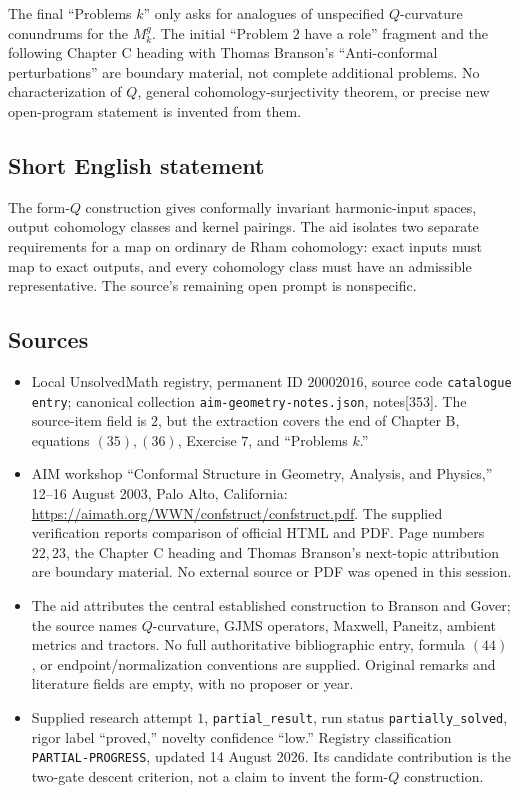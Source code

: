 \documentclass[11pt]{article}
\begin{document}
The final ``Problems \(k\)'' only asks for analogues of unspecified \(Q\)-curvature conundrums for the \(M_k^g\). The initial ``Problem \(2\) have a role'' fragment and the following Chapter C heading with Thomas Branson's ``Anti-conformal perturbations'' are boundary material, not complete additional problems. No characterization of \(Q\), general cohomology-surjectivity theorem, or precise new open-program statement is invented from them.
\subsection{Short English statement}
The form-\(Q\) construction gives conformally invariant harmonic-input spaces, output cohomology classes and kernel pairings. The aid isolates two separate requirements for a map on ordinary de Rham cohomology: exact inputs must map to exact outputs, and every cohomology class must have an admissible representative. The source's remaining open prompt is nonspecific.
\subsection{Sources}
\begin{itemize}
\item Local UnsolvedMath registry, permanent ID \(20002016\), source code \texttt{catalogue entry}; canonical collection \texttt{aim-geometry-notes.json}, notes[353]. The source-item field is \(2\), but the extraction covers the end of Chapter B, equations \((35),(36)\), Exercise \(7\), and ``Problems \(k\).''
\item AIM workshop ``Conformal Structure in Geometry, Analysis, and Physics,'' 12--16 August 2003, Palo Alto, California: \url{https://aimath.org/WWN/confstruct/confstruct.pdf}. The supplied verification reports comparison of official HTML and PDF. Page numbers \(22,23\), the Chapter C heading and Thomas Branson's next-topic attribution are boundary material. No external source or PDF was opened in this session.
\item The aid attributes the central established construction to Branson and Gover; the source names \(Q\)-curvature, GJMS operators, Maxwell, Paneitz, ambient metrics and tractors. No full authoritative bibliographic entry, formula \((44)\), or endpoint/normalization conventions are supplied. Original remarks and literature fields are empty, with no proposer or year.
\item Supplied research attempt \(1\), \texttt{partial\_result}, run status \texttt{partially\_solved}, rigor label ``proved,'' novelty confidence ``low.'' Registry classification \texttt{PARTIAL-PROGRESS}, updated 14 August 2026. Its candidate contribution is the two-gate descent criterion, not a claim to invent the form-\(Q\) construction.
\end{itemize}
\end{document}
